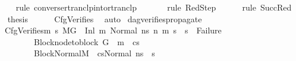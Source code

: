 \begin{isabellebody}
\ \ \ \ \isamarkupfalse%
\ {\isacharparenleft}{\kern0pt}rule\ converse{\isacharunderscore}{\kern0pt}rtranclp{\isacharunderscore}{\kern0pt}into{\isacharunderscore}{\kern0pt}rtranclp{\isacharparenright}{\kern0pt}\isanewline
\ \ \ \ \ \isamarkupfalse%
\ {\isacharparenleft}{\kern0pt}rule\ RedStep{\isacharparenright}{\kern0pt}\isanewline
\ \ \ \ \isamarkupfalse%
\ {\isacharparenleft}{\kern0pt}rule\ SuccRed{\isacharparenright}{\kern0pt}\isanewline
\ \ \isamarkupfalse%
\ {\isacharquery}{\kern0pt}thesis\isanewline
\ \ \ \ \isamarkupfalse%
\ CfgVerifies\ \isamarkupfalse%
\ auto\isanewline
{}\isamarkupfalse%
%
\endisatagproof
{\isafoldproof}%
%
\isadelimproof
\isanewline
%
\endisadelimproof
\isanewline
{}\isamarkupfalse%
\ dag{\isacharunderscore}{\kern0pt}verifies{\isacharunderscore}{\kern0pt}propagate{\isacharunderscore}{\kern0pt}{}{\isacharcolon}{\kern0pt}\isanewline
\ \ \ CfgVerifies{\isacharcolon}{\kern0pt}{\isachardoublequoteopen}{\isacharparenleft}{\kern0pt}{\isasymAnd}m{}{\isacharprime}{\kern0pt}\ s{}{\isacharprime}{\kern0pt}{\isachardot}{\kern0pt}\ M{\isacharcomma}{\kern0pt}{\isasymLambda}{\isacharcomma}{\kern0pt}{\isasymGamma}{\isacharcomma}{\kern0pt}{\isasymOmega}{\isacharcomma}{\kern0pt}G\ {\isasymturnstile}\ {\isacharparenleft}{\kern0pt}Inl\ m{\isacharcomma}{\kern0pt}\ Normal\ ns{\isacharparenright}{\kern0pt}\ {\isacharminus}{\kern0pt}n{\isasymrightarrow}{\isacharasterisk}{\kern0pt}\ {\isacharparenleft}{\kern0pt}m{}{\isacharprime}{\kern0pt}{\isacharcomma}{\kern0pt}\ s{}{\isacharprime}{\kern0pt}{\isacharparenright}{\kern0pt}\ {\isasymLongrightarrow}\ s{}{\isacharprime}{\kern0pt}\ {\isasymnoteq}\ Failure{\isacharparenright}{\kern0pt}{\isachardoublequoteclose}\ \isanewline
\ \ \ \ \ \ \ \ \ \ Block{\isacharcolon}{\kern0pt}{\isachardoublequoteopen}node{\isacharunderscore}{\kern0pt}to{\isacharunderscore}{\kern0pt}block\ G\ {\isacharbang}{\kern0pt}\ m\ {\isacharequal}{\kern0pt}\ cs{\isachardoublequoteclose}\ \isanewline
\ \ \ \ \ \ \ \ \ \ BlockNormal{\isacharcolon}{\kern0pt}{\isachardoublequoteopen}M{\isacharcomma}{\kern0pt}{\isasymLambda}{\isacharcomma}{\kern0pt}{\isasymGamma}{\isacharcomma}{\kern0pt}{\isasymOmega}\ {\isasymturnstile}\ {\isasymlangle}cs{\isacharcomma}{\kern0pt}Normal\ ns{\isasymrangle}\ {\isacharbrackleft}{\kern0pt}{\isasymrightarrow}{\isacharbrackright}{\kern0pt}\ s{\isacharprime}{\kern0pt}{\isachardoublequoteclose}\isanewline

\end{isabellebody}
